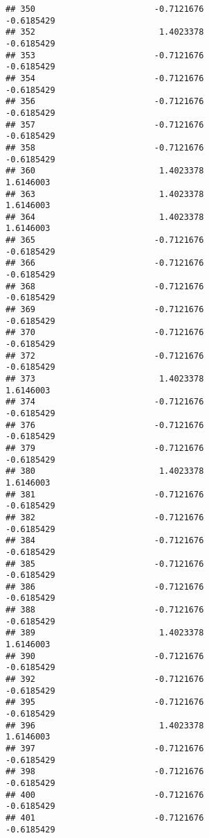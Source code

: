 \documentclass[
]{article}
\begin{document}
\begin{verbatim}
## 350                        -0.7121676                       -0.6185429
## 352                         1.4023378                       -0.6185429
## 353                        -0.7121676                       -0.6185429
## 354                        -0.7121676                       -0.6185429
## 356                        -0.7121676                       -0.6185429
## 357                        -0.7121676                       -0.6185429
## 358                        -0.7121676                       -0.6185429
## 360                         1.4023378                        1.6146003
## 363                         1.4023378                        1.6146003
## 364                         1.4023378                        1.6146003
## 365                        -0.7121676                       -0.6185429
## 366                        -0.7121676                       -0.6185429
## 368                        -0.7121676                       -0.6185429
## 369                        -0.7121676                       -0.6185429
## 370                        -0.7121676                       -0.6185429
## 372                        -0.7121676                       -0.6185429
## 373                         1.4023378                        1.6146003
## 374                        -0.7121676                       -0.6185429
## 376                        -0.7121676                       -0.6185429
## 379                        -0.7121676                       -0.6185429
## 380                         1.4023378                        1.6146003
## 381                        -0.7121676                       -0.6185429
## 382                        -0.7121676                       -0.6185429
## 384                        -0.7121676                       -0.6185429
## 385                        -0.7121676                       -0.6185429
## 386                        -0.7121676                       -0.6185429
## 388                        -0.7121676                       -0.6185429
## 389                         1.4023378                        1.6146003
## 390                        -0.7121676                       -0.6185429
## 392                        -0.7121676                       -0.6185429
## 395                        -0.7121676                       -0.6185429
## 396                         1.4023378                        1.6146003
## 397                        -0.7121676                       -0.6185429
## 398                        -0.7121676                       -0.6185429
## 400                        -0.7121676                       -0.6185429
## 401                        -0.7121676                       -0.6185429

\end{verbatim}
\end{document}
